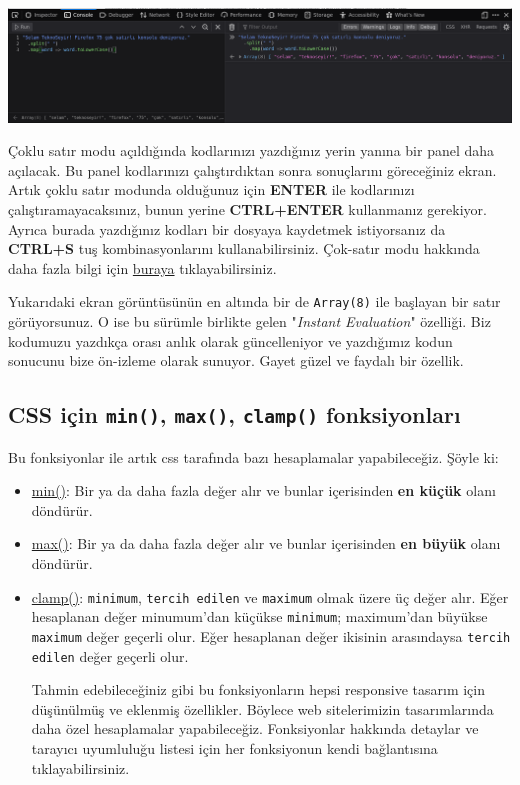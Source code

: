 \documentclass[11pt]{article}
\begin{document}
\begin{center}
\includegraphics[width=.9\linewidth]{gorseller/firefox75-console.png}
\end{center}

Çoklu satır modu açıldığında kodlarınızı yazdığınız yerin yanına bir panel
daha açılacak. Bu panel kodlarınızı çalıştırdıktan sonra sonuçlarını
göreceğiniz ekran. Artık çoklu satır modunda olduğunuz için \textbf{ENTER} ile
kodlarınızı çalıştıramayacaksınız, bunun yerine \textbf{CTRL+ENTER} kullanmanız
gerekiyor. Ayrıca burada yazdığınız kodları bir dosyaya kaydetmek
istiyorsanız da \textbf{CTRL+S} tuş kombinasyonlarını kullanabilirsiniz. Çok-satır
modu hakkında daha fazla bilgi için \href{https://developer.mozilla.org/en-US/docs/Tools/Web\_Console/The\_command\_line\_interpreter\#Multi-line\_mode}{buraya} tıklayabilirsiniz.

Yukarıdaki ekran görüntüsünün en altında bir de \texttt{Array(8)} ile başlayan bir
satır görüyorsunuz. O ise bu sürümle birlikte gelen "\emph{Instant Evaluation}"
özelliği. Biz kodumuzu yazdıkça orası anlık olarak güncelleniyor ve
yazdığımız kodun sonucunu bize ön-izleme olarak sunuyor. Gayet güzel ve
faydalı bir özellik.
\subsection{CSS için \texttt{min()}, \texttt{max()}, \texttt{clamp()} fonksiyonları}
\label{sec:orgd7d6f9d}
Bu fonksiyonlar ile artık css tarafında bazı hesaplamalar yapabileceğiz.
Şöyle ki:

\begin{itemize}
\item \href{https://developer.mozilla.org/en-US/docs/Web/CSS/min}{min()}: Bir ya da daha fazla değer alır ve bunlar içerisinden \textbf{en küçük}
olanı döndürür.
\item \href{https://developer.mozilla.org/en-US/docs/Web/CSS/max}{max()}: Bir ya da daha fazla değer alır ve bunlar içerisinden \textbf{en büyük}
olanı döndürür.
\item \href{https://developer.mozilla.org/en-US/docs/Web/CSS/clamp}{clamp()}: \texttt{minimum}, \texttt{tercih edilen} ve \texttt{maximum} olmak üzere üç değer
alır. Eğer hesaplanan değer minumum'dan küçükse \texttt{minimum}; maximum'dan
büyükse \texttt{maximum} değer geçerli olur. Eğer hesaplanan değer ikisinin
arasındaysa \texttt{tercih edilen} değer geçerli olur.

Tahmin edebileceğiniz gibi bu fonksiyonların hepsi responsive tasarım için
düşünülmüş ve eklenmiş özellikler. Böylece web sitelerimizin tasarımlarında
daha özel hesaplamalar yapabileceğiz. Fonksiyonlar hakkında detaylar ve
tarayıcı uyumluluğu listesi için her fonksiyonun kendi bağlantısına
tıklayabilirsiniz.
\end{itemize}
\end{document}
